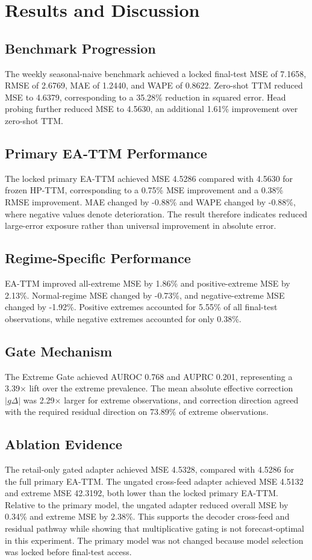 \section{Results and Discussion}

\subsection{Benchmark Progression}
The weekly seasonal-naive benchmark achieved a locked final-test MSE of 7.1658, RMSE of 2.6769, MAE of 1.2440, and WAPE of 0.8622. Zero-shot TTM reduced MSE to 4.6379, corresponding to a 35.28\% reduction in squared error. Head probing further reduced MSE to 4.5630, an additional 1.61\% improvement over zero-shot TTM.

\subsection{Primary EA-TTM Performance}
The locked primary EA-TTM achieved MSE 4.5286 compared with 4.5630 for frozen HP-TTM, corresponding to a 0.75\% MSE improvement and a 0.38\% RMSE improvement. MAE changed by -0.88\% and WAPE changed by -0.88\%, where negative values denote deterioration. The result therefore indicates reduced large-error exposure rather than universal improvement in absolute error.

\subsection{Regime-Specific Performance}
EA-TTM improved all-extreme MSE by 1.86\% and positive-extreme MSE by 2.13\%. Normal-regime MSE changed by -0.73\%, and negative-extreme MSE changed by -1.92\%. Positive extremes accounted for 5.55\% of all final-test observations, while negative extremes accounted for only 0.38\%.

\subsection{Gate Mechanism}
The Extreme Gate achieved AUROC 0.768 and AUPRC 0.201, representing a 3.39$\times$ lift over the extreme prevalence. The mean absolute effective correction $|g\Delta|$ was 2.29$\times$ larger for extreme observations, and correction direction agreed with the required residual direction on 73.89\% of extreme observations.

\subsection{Ablation Evidence}
The retail-only gated adapter achieved MSE 4.5328, compared with 4.5286 for the full primary EA-TTM. The ungated cross-feed adapter achieved MSE 4.5132 and extreme MSE 42.3192, both lower than the locked primary EA-TTM. Relative to the primary model, the ungated adapter reduced overall MSE by 0.34\% and extreme MSE by 2.38\%. This supports the decoder cross-feed and residual pathway while showing that multiplicative gating is not forecast-optimal in this experiment. The primary model was not changed because model selection was locked before final-test access.

